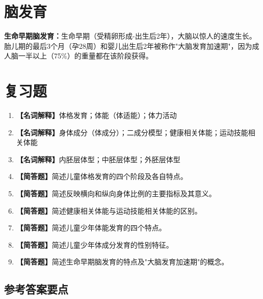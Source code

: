 \section{脑发育}

\begin{defbox}
\textbf{生命早期脑发育：}生命早期（受精卵形成-出生后2年），大脑以惊人的速度生长。胎儿期的最后3个月（孕28周）和婴儿出生后2年被称作"大脑发育加速期"，因为成人脑一半以上（75\%）的重量都在该阶段获得。
\end{defbox}

\section{复习题}

\begin{enumerate}[leftmargin=*, itemsep=8pt]
    \item \textbf{【名词解释】}体格发育；体能（体适能）；体力活动
    \item \textbf{【名词解释】}身体成分（体成分）；二成分模型；健康相关体能；运动技能相关体能
    \item \textbf{【名词解释】}内胚层体型；中胚层体型；外胚层体型
    \item \textbf{【简答题】}简述儿童体格发育的四个阶段及各自特点。
    \item \textbf{【简答题】}简述反映横向和纵向身体比例的主要指标及其意义。
    \item \textbf{【简答题】}简述健康相关体能与运动技能相关体能的区别。
    \item \textbf{【简答题】}简述儿童少年体能发育的四个特点。
    \item \textbf{【简答题】}简述儿童少年体成分发育的性别特征。
    \item \textbf{【简答题】}简述生命早期脑发育的特点及"大脑发育加速期"的概念。
\end{enumerate}

\subsection*{参考答案要点}

